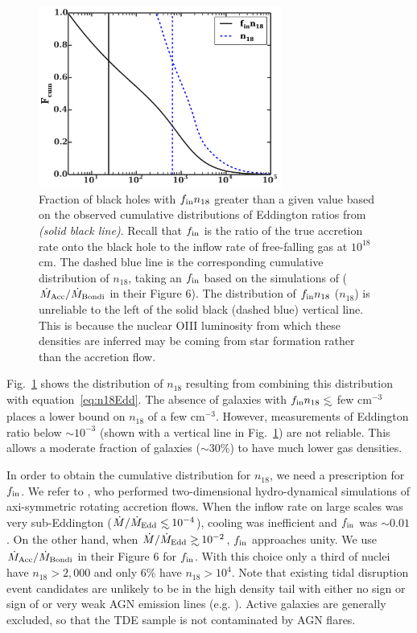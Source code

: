 \documentclass[usenatbib,fleqn]{mnras}
\newcommand\lsim{\mathrel{\rlap{\lower4pt\hbox{\hskip1pt$\sim$}}
    \raise1pt\hbox{$<$}}}
\newcommand\gsim{\mathrel{\rlap{\lower4pt\hbox{\hskip1pt$\sim$}}
    \raise1pt\hbox{$>$}}}
\begin{document}
\begin{figure}
\includegraphics[width=8cm]{fcum_n18.pdf}
\caption{\label{fig:n18Cum} Fraction of black holes with $f_{\rm in}
  n_{18}$ greater than a given value based on the observed cumulative
  distributions of Eddington ratios from \citet{Kauffmann+2009}
  {\it (solid black line)}. Recall that $f_{\rm in}$ is the ratio of
  the true accretion rate onto the black hole to the inflow rate of
  free-falling gas at $10^{18}$ cm.  The dashed blue line is the
  corresponding cumulative distribution of $n_{18}$, taking an $f_{\rm
    in}$ based on the simulations of \citet{Li+2013} ( $\dot{M}_{\rm
    Acc}/\dot{M}_{\rm Bondi}$ in their Figure 6). The distribution of
  $f_{\rm in} n_{18}$ ($n_{18}$) is unreliable to the left of the
  solid black (dashed blue) vertical line. This is because the nuclear
  OIII luminosity from which these densities are inferred may be
  coming from star formation rather than the accretion flow.}
\end{figure}


Fig.~\ref{fig:n18Cum} shows the distribution of $n_{18}$ resulting
from combining this distribution with equation~\eqref{eq:n18Edd}.  The
absence of galaxies with $f_{\rm in }n_{18} \lsim$ few cm$^{-3}$
places a lower bound on $n_{18}$ of a few cm$^{-3}$.  However,
measurements of Eddington ratio below $\sim 10^{-3}$ (shown with a
vertical line in Fig.~\ref{fig:n18Cum}) are not reliable. This allows a
moderate fraction of galaxies ($\sim 30\%$) to have much lower gas
densities.


In order to obtain the cumulative distribution for $n_{18}$, we need a
prescription for $f_{\rm in}$. We refer to \citet{Li+2013}, who
performed two-dimensional hydro-dynamical simulations of axi-symmetric
rotating accretion flows. When the inflow rate on large scales was
very sub-Eddington ($\dot{M}/\dot{M}_{\rm Edd} \lsim 10^{-4}$),
cooling was inefficient and $f_{\rm in}$ was $\sim 0.01$. On the other
hand, when $\dot{M}/\dot{M}_{\rm Edd}\gsim 10^{-2}$, $f_{\rm in}$
approaches unity.  We use $\dot{M}_{\rm Acc}/\dot{M}_{\rm Bondi}$ in
their Figure 6 for $f_{\rm in}$.  With this choice only a third of
nuclei have $n_{18}>2,000$ and only 6\% have $n_{18}>10^{4}$. Note
that existing tidal disruption event candidates are unlikely to be in
the high density tail with either no sign or sign of or very weak AGN
emission lines (e.g. \citealt{van-Velzen+2011, Arcavi+2014}). Active
galaxies are generally excluded, so that the TDE sample is not
contaminated by AGN flares.
\end{document}

